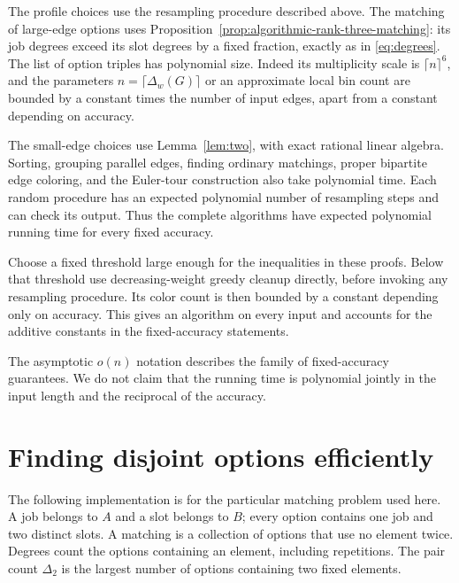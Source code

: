 \documentclass[11pt]{article}
\theoremstyle{definition}\newtheorem{algorithm}{Algorithm}[section]
\numberwithin{equation}{section}
\theoremstyle{remark}\newtheorem*{remark}{Remark}
\begin{document}
The profile choices use the resampling procedure described above.
The matching of large-edge options uses
Proposition~\ref{prop:algorithmic-rank-three-matching}: its job degrees
exceed its slot degrees by a fixed fraction, exactly as in
\eqref{eq:degrees}. The list of option triples has polynomial size.
Indeed its multiplicity scale is $\lceil n\rceil^6$, and the parameters
$n=\lceil\Delta_w(G)\rceil$ or an approximate local bin count are
bounded by a constant times the number of input edges, apart from a
constant depending on accuracy.

The small-edge choices use Lemma~\ref{lem:two}, with exact rational
linear algebra. Sorting, grouping parallel edges, finding ordinary
matchings, proper bipartite edge coloring, and the Euler-tour
construction also take polynomial time. Each random procedure has an
expected polynomial number of resampling steps and can check its
output. Thus the complete algorithms have expected polynomial running
time for every fixed accuracy.

Choose a fixed threshold large enough for the inequalities in these
proofs. Below that threshold use decreasing-weight greedy cleanup
directly, before invoking any resampling procedure. Its color count is
then bounded by a constant depending only on accuracy. This gives an
algorithm on every input and accounts for the additive constants in
the fixed-accuracy statements.

The asymptotic $o(n)$ notation describes the family of fixed-accuracy
guarantees. We do not claim that the running time is polynomial jointly
in the input length and the reciprocal of the accuracy.

\section{Finding disjoint options efficiently}\label{sec:matching-algorithm}
The following implementation is for the particular matching problem
used here. A job belongs to $A$ and a slot belongs to $B$; every option
contains one job and two distinct slots. A matching is a collection of
options that use no element twice. Degrees count the options containing
an element, including repetitions. The pair count $\Delta_2$ is the
largest number of options containing two fixed elements.
\end{document}
